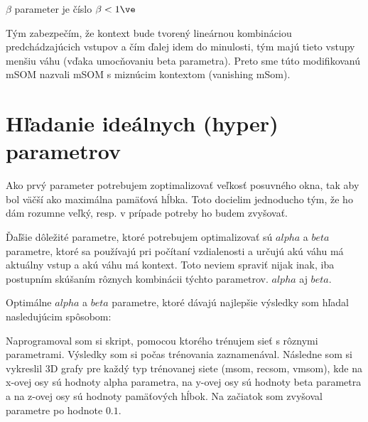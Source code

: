 $\beta$ parameter je číslo $\beta < 1 \ve$

Tým zabezpečím, že kontext bude tvorený lineárnou kombináciou 
predchádzajúcich vstupov a čím ďalej idem do minulosti, tým majú tieto vstupy 
menšiu váhu (vďaka umocňovaniu beta parametra). Preto sme túto modifikovanú mSOM nazvali 
mSOM s miznúcim kontextom (vanishing mSom).

\section{Hľadanie ideálnych (hyper) parametrov}
Ako prvý parameter potrebujem zoptimalizovať veľkosť posuvného okna, tak aby bol väčší ako
maximálna pamäťová hĺbka. Toto docielim jednoducho tým, že ho dám rozumne veľký, resp. v prípade
potreby ho budem zvyšovať.

Ďaľšie dôležité parametre, ktoré potrebujem optimalizovať sú $alpha$ a $beta$ parametre, ktoré 
sa používajú pri počítaní vzdialenosti a určujú akú váhu má aktuálny vstup a akú váhu má kontext.
Toto neviem spraviť nijak inak, iba postupním skúšaním rôznych kombinácii týchto parametrov. 
$alpha$ aj $beta$.

Optimálne $alpha$ a $beta$ parametre, ktoré dávajú najlepšie výsledky som hľadal nasledujúcim
spôsobom:

Naprogramoval som si skript, pomocou ktorého trénujem sieť s rôznymi parametrami.
Výsledky som si počas trénovania zaznamenával.
Následne som si vykreslil 3D grafy pre každý typ trénovanej siete (msom, recsom, vmsom), 
kde na x-ovej osy sú hodnoty alpha parametra, na y-ovej osy sú hodnoty beta parametra a
na z-ovej osy sú hodnoty pamäťových hĺbok.
Na začiatok som zvyšoval parametre po hodnote $0.1$.








